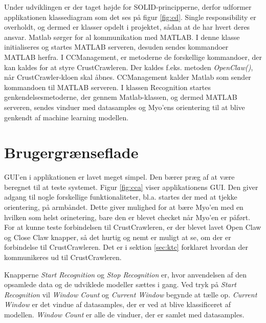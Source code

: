 
Under udviklingen er der taget højde for SOLID-principperne\citep{RefWorks:10}, derfor udformer applikationen klassediagram som det ses på figur \ref{fig:cd}. Single responsibility\citep{RefWorks:9} er overholdt, og dermed er klasser opdelt i projektet, sådan at de har hvert deres ansvar. Matlab sørger for al kommunikation med MATLAB. I denne klasse initialiseres og startes MATLAB serveren, desuden sendes kommandoer MATLAB herfra. I CCManagement, er metoderne de forskellige kommandoer, der kan kaldes for at styre CrustCrawleren. Der kaldes f.eks. metoden \textit{OpenClaw()}, når CrustCrawler-kloen skal åbnes. CCManagement kalder Matlab som sender kommandoen til MATLAB serveren. I klassen Recognition startes genkendelsesmetoderne, der gennem Matlab-klassen, og dermed MATLAB serveren, sendes vinduer med datasamples og Myo'ens orientering til at blive genkendt af machine learning modellen.



\section{Brugergrænseflade}

GUI'en i applikationen er lavet meget simpel. Den bærer præg af at være beregnet til at teste systemet. Figur \ref{fig:cca} viser applikationens GUI. Den giver adgang til nogle forskellige funktionaliteter, bl.a. startes der med at tjekke orientering, på armbåndet. Dette giver mulighed for at bære Myo'en med en hvilken som helst orinetering, bare den er blevet checket når Myo'en er påført. For at kunne teste forbindelsen til CrustCrawleren, er der blevet lavet Open Claw og Close Claw knapper, så det hurtig og nemt er muligt at se, om der er forbindelse til CrustCrawleren. Det er i sektion \ref{sec:ktc} forklaret hvordan der kommunikeres ud til CrustCrawleren.

Knapperne \textit{Start Recognition} og \textit{Stop Recognition} er, hvor anvendelsen af den opsamlede data og de udviklede modeller sættes i gang. Ved tryk på \textit{Start Recognition} vil \textit{Window Count} og \textit{Current Window} begynde at tælle op. \textit{Current Window} er det vindue af datasamples, der er ved at blive klassificeret af modellen. \textit{Window Count} er alle de vinduer, der er samlet med datasamples.

